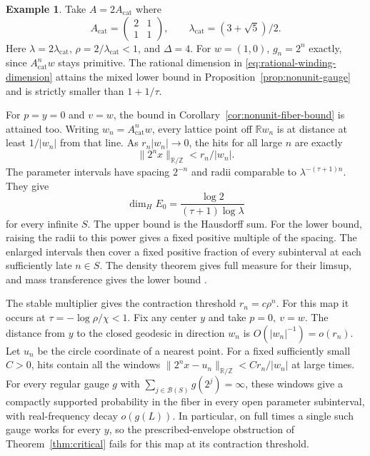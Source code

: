 \documentclass[11pt,a4paper,reqno]{amsart}
\theoremstyle{definition}
\newtheorem{example}[theorem]{Example}
\theoremstyle{remark}
\numberwithin{equation}{section}
\begin{document}
\begin{example}\label{ex:nonunit-cat}
Take \(A=2A_{\mathrm{cat}}\) where
\[
 A_{\mathrm{cat}}=\begin{pmatrix}2&1\\1&1\end{pmatrix},
 \qquad \lambda_{\mathrm{cat}}=(3+\sqrt5)/2 .
\]
Here \(\lambda=2\lambda_{\mathrm{cat}}\), \(\rho=2/\lambda_{\mathrm{cat}}<1\),
and \(\Delta=4\). For \(w=(1,0)\), \(g_n=2^n\) exactly,
since \(A_{\mathrm{cat}}^nw\) stays primitive.
The rational dimension in \eqref{eq:rational-winding-dimension}
attains the mixed lower bound in Proposition~\ref{prop:nonunit-gauge}
and is strictly smaller than \(1+1/\tau\).

For \(p=y=0\) and \(v=w\), the bound in
Corollary~\ref{cor:nonunit-fiber-bound} is attained too.
Writing \(w_n=A_{\mathrm{cat}}^n w\), every lattice point off
\(\mathbb R w_n\) is at distance at least \(1/|w_n|\) from
that line. As \(r_n|w_n|\to0\), the hits for all large \(n\)
are exactly
\[
 \|2^n x\|_{\mathbb R/\mathbb Z}<r_n/|w_n|.
\]
The parameter intervals have spacing \(2^{-n}\) and radii
comparable to \(\lambda^{-(\tau+1)n}\). They give
\[
 \dim_H E_0=\frac{\log 2}{(\tau+1)\log\lambda}
\]
for every infinite \(S\). The upper bound is the Hausdorff sum.
For the lower bound, raising the radii to this power gives a
fixed positive multiple of the spacing. The enlarged intervals
then cover a fixed positive fraction of every subinterval at
each sufficiently late \(n\in S\). The density theorem gives
full measure for their limsup, and mass transference gives the
lower bound \cite[Theorem~2]{BV}.

The stable multiplier gives the contraction threshold \(r_n=c\rho^n\).
For this map it occurs at \(\tau=-\log\rho/\chi<1\).
Fix any center \(y\) and take
\(p=0,\ v=w\). The distance from \(y\) to the closed geodesic
in direction \(w_n\) is \(O(|w_n|^{-1})=o(r_n)\). Let \(u_n\)
be the circle coordinate of a nearest point. For a fixed
sufficiently small \(C>0\), hits contain all the windows
\(\|2^n x-u_n\|_{\mathbb R/\mathbb Z}<C r_n/|w_n|\) at large
times. For every regular gauge \(g\) with
\(\sum_{j\in\mathcal B(S)} g(2^j)=\infty\), these windows give a
compactly supported probability in the fiber in every open
parameter subinterval, with real-frequency decay \(o(g(L))\).
In particular, on full times a single such gauge works for every
\(y\), so the prescribed-envelope obstruction of
Theorem~\ref{thm:critical} fails for this map at its contraction
threshold.


\end{example}
\end{document}
